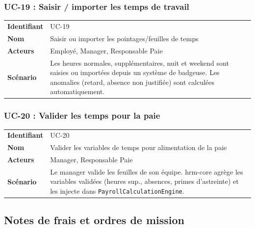 \documentclass[a4paper,12pt,openany]{book}
\begin{document}
    \subsubsection*{UC-19 : Saisir / importer les temps de travail}
    \begin{table}[H]
        \centering
        \begin{tabularx}{\textwidth}{lX}
    \toprule
    \textbf{Identifiant} & UC-19 \\
    \textbf{Nom}         & Saisir ou importer les pointages/feuilles de temps \\
    \textbf{Acteurs}     & Employé, Manager, Responsable Paie \\
    \midrule
    \textbf{Scénario} & Les heures normales, supplémentaires, nuit et weekend sont saisies ou importées depuis un système de badgeuse. Les anomalies (retard, absence non justifiée) sont calculées automatiquement. \\
    \bottomrule
        \end{tabularx}
    \end{table}

    \subsubsection*{UC-20 : Valider les temps pour la paie}
    \begin{table}[H]
        \centering
        \begin{tabularx}{\textwidth}{lX}
    \toprule
    \textbf{Identifiant} & UC-20 \\
    \textbf{Nom}         & Valider les variables de temps pour alimentation de la paie \\
    \textbf{Acteurs}     & Manager, Responsable Paie \\
    \midrule
    \textbf{Scénario} & Le manager valide les feuilles de son équipe. hrm-core agrège les variables validées (heures sup., absences, primes d'astreinte) et les injecte dans \texttt{PayrollCalculationEngine}. \\
    \bottomrule
        \end{tabularx}
    \end{table}


    \subsection{Notes de frais et ordres de mission}
\end{document}

